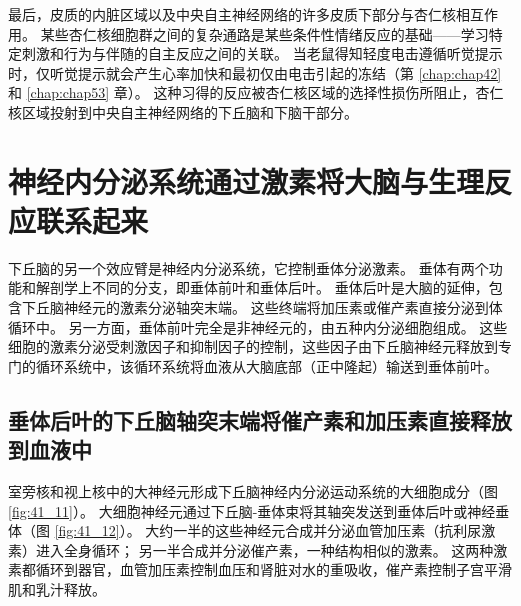 最后，皮质的内脏区域以及中央自主神经网络的许多皮质下部分与杏仁核相互作用。 某些杏仁核细胞群之间的复杂通路是某些条件性情绪反应的基础——学习特定刺激和行为与伴随的自主反应之间的关联。 当老鼠得知轻度电击遵循听觉提示时，仅听觉提示就会产生心率加快和最初仅由电击引起的冻结（第 \ref{chap:chap42} 和 \ref{chap:chap53} 章）。 这种习得的反应被杏仁核区域的选择性损伤所阻止，杏仁核区域投射到中央自主神经网络的下丘脑和下脑干部分。


\section{神经内分泌系统通过激素将大脑与生理反应联系起来}
下丘脑的另一个效应臂是神经内分泌系统，它控制垂体分泌激素。 垂体有两个功能和解剖学上不同的分支，即垂体前叶和垂体后叶。 垂体后叶是大脑的延伸，包含下丘脑神经元的激素分泌轴突末端。 这些终端将加压素或催产素直接分泌到体循环中。 另一方面，垂体前叶完全是非神经元的，由五种内分泌细胞组成。 这些细胞的激素分泌受刺激因子和抑制因子的控制，这些因子由下丘脑神经元释放到专门的循环系统中，该循环系统将血液从大脑底部（正中隆起）输送到垂体前叶。

\subsection{垂体后叶的下丘脑轴突末端将催产素和加压素直接释放到血液中}

室旁核和视上核中的大神经元形成下丘脑神经内分泌运动系统的大细胞成分（图 \ref{fig:41_11}）。 
大细胞神经元通过下丘脑-垂体束将其轴突发送到垂体后叶或神经垂体（图 \ref{fig:41_12}）。 大约一半的这些神经元合成并分泌血管加压素（抗利尿激素）进入全身循环； 另一半合成并分泌催产素，一种结构相似的激素。 这两种激素都循环到器官，血管加压素控制血压和肾脏对水的重吸收，催产素控制子宫平滑肌和乳汁释放。

